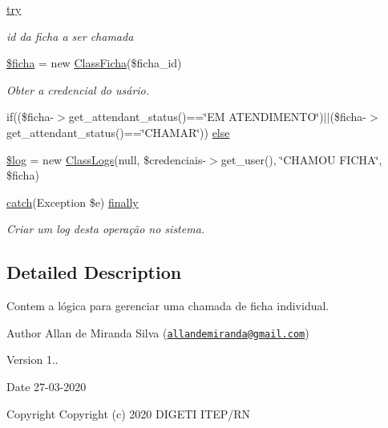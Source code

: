 \begin{DoxyCompactItemize}
\hyperlink{nao_atendidos_proximo_individual_8php_abe4cc9788f52e49485473dc699537388}{try}
\begin{DoxyCompactList}\small\item\em id da ficha a ser chamada \end{DoxyCompactList}\item 
\hyperlink{nao_atendidos_proximo_individual_8php_aab83e7ad10d8c95fdbf231d086b83a1f}{\$ficha} = new \hyperlink{class_class_ficha}{Class\+Ficha}(\$ficha\+\_\+id)
\begin{DoxyCompactList}\small\item\em Obter a credencial do usário. \end{DoxyCompactList}\item 
if((\$ficha-\/$>$get\+\_\+attendant\+\_\+status()==\char`\"{}EM A\+T\+E\+N\+D\+I\+M\+E\+N\+TO\char`\"{})$\vert$$\vert$(\$ficha-\/$>$get\+\_\+attendant\+\_\+status()==\char`\"{}C\+H\+A\+M\+AR\char`\"{})) \hyperlink{nao_atendidos_proximo_individual_8php_a78fd13ad9c6e0bbd8b5273273c4e2724}{else}
\item 
\hyperlink{nao_atendidos_proximo_individual_8php_a9a2cf15a653aee8be437f7ae474cd494}{\$log} = new \hyperlink{class_class_logs}{Class\+Logs}(null, \$credenciais-\/$>$get\+\_\+user(), \char`\"{}C\+H\+A\+M\+OU F\+I\+C\+HA\char`\"{}, \$ficha)
\item 
\hyperlink{imprimir_2ficha_2index_8php_a8104793004944f01dd070fc8b1ade3c4}{catch}(Exception \$e) \hyperlink{nao_atendidos_proximo_individual_8php_a1eb47d68a4a4f73debf91b15e179d813}{finally}
\begin{DoxyCompactList}\small\item\em Criar um log desta operação no sistema. \end{DoxyCompactList}\end{DoxyCompactItemize}


\subsection{Detailed Description}
Contem a lógica para gerenciar uma chamada de ficha individual. 

\begin{DoxyAuthor}{Author}
Allan de Miranda Silva (\href{mailto:allandemiranda@gmail.com}{\tt allandemiranda@gmail.\+com}) 
\end{DoxyAuthor}
\begin{DoxyVersion}{Version}
1.. 
\end{DoxyVersion}
\begin{DoxyDate}{Date}
27-\/03-\/2020
\end{DoxyDate}
\begin{DoxyCopyright}{Copyright}
Copyright (c) 2020 D\+I\+G\+E\+TI I\+T\+E\+P/\+RN 
\end{DoxyCopyright}


